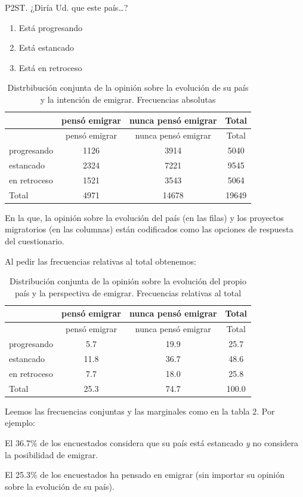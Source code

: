 \documentclass[]{book}
\providecommand{\tightlist}{%
  \setlength{\itemsep}{0pt}\setlength{\parskip}{0pt}}
\begin{document}
P2ST. ¿Diría Ud. que este país\ldots{}?

\begin{enumerate}
\def\labelenumi{\arabic{enumi}.}
\tightlist
\item
  Está progresando
\item
  Está estancado
\item
  Está en retroceso
\end{enumerate}

\begin{longtable}[]{@{}lccc@{}}
\caption{\label{tab:abs}Distrbibución conjunta de la opinión sobre la evolución de su país y la intención de emigrar. Frecuencias absolutas}\tabularnewline
\toprule
& pensó emigrar & nunca pensó emigrar & Total\tabularnewline
\midrule
\endfirsthead
\toprule
& pensó emigrar & nunca pensó emigrar & Total\tabularnewline
\midrule
\endhead
progresando & 1126 & 3914 & 5040\tabularnewline
estancado & 2324 & 7221 & 9545\tabularnewline
en retroceso & 1521 & 3543 & 5064\tabularnewline
Total & 4971 & 14678 & 19649\tabularnewline
\bottomrule
\end{longtable}

En la que, la opinión sobre la evolución del país (en las filas) y los proyectos migratorios (en las columnas) están codificados como las opciones de respuesta del cuestionario.

Al pedir las frecuencias relativas al total obtenemos:

\begin{longtable}[]{@{}lccc@{}}
\caption{\label{tab:rel}Distribución conjunta de la opinión sobre la evolución del propio país y la perspectiva de emigrar. Frecuencias relativas al total}\tabularnewline
\toprule
& pensó emigrar & nunca pensó emigrar & Total\tabularnewline
\midrule
\endfirsthead
\toprule
& pensó emigrar & nunca pensó emigrar & Total\tabularnewline
\midrule
\endhead
progresando & 5.7 & 19.9 & 25.7\tabularnewline
estancado & 11.8 & 36.7 & 48.6\tabularnewline
en retroceso & 7.7 & 18.0 & 25.8\tabularnewline
Total & 25.3 & 74.7 & 100.0\tabularnewline
\bottomrule
\end{longtable}

Leemos las frecuencias conjuntas y las marginales como en la tabla 2.
Por ejemplo:

El 36.7\% de los encuestados considera que su país está estancado \emph{y} no considera la posibilidad de emigrar.

El 25.3\% de los encuestados ha pensado en emigrar (sin importar su opinión sobre la evolución de su país).
\end{document}
